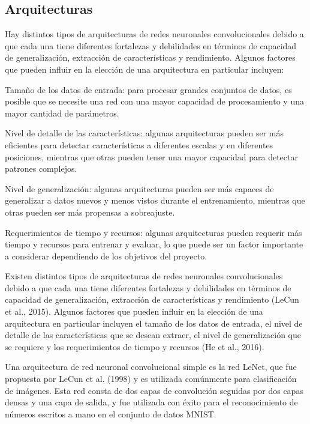 
\subsection{Arquitecturas}


Hay distintos tipos de arquitecturas de redes neuronales convolucionales debido a que cada una tiene diferentes
fortalezas y debilidades en términos de capacidad de generalización, extracción de características y rendimiento.
Algunos factores que pueden influir en la elección de una arquitectura en particular incluyen:

Tamaño de los datos de entrada: para procesar grandes conjuntos de datos, es posible que se necesite una red con una
mayor capacidad de procesamiento y una mayor cantidad de parámetros.

Nivel de detalle de las características: algunas arquitecturas pueden ser más eficientes para detectar características
a diferentes escalas y en diferentes posiciones, mientras que otras pueden tener una mayor capacidad para detectar
patrones complejos.

Nivel de generalización: algunas arquitecturas pueden ser más capaces de generalizar a datos nuevos y menos vistos
durante el entrenamiento, mientras que otras pueden ser más propensas a sobreajuste.

Requerimientos de tiempo y recursos: algunas arquitecturas pueden requerir más tiempo y recursos para entrenar y
evaluar, lo que puede ser un factor importante a considerar dependiendo de los objetivos del proyecto.


Existen distintos tipos de arquitecturas de redes neuronales convolucionales debido a que cada una tiene diferentes
fortalezas y debilidades en términos de capacidad de generalización, extracción de características y rendimiento (LeCun
et al., 2015). Algunos factores que pueden influir en la elección de una arquitectura en particular incluyen el tamaño
de los datos de entrada, el nivel de detalle de las características que se desean extraer, el nivel de generalización
que se requiere y los requerimientos de tiempo y recursos (He et al., 2016).

Una arquitectura de red neuronal convolucional simple es la red LeNet, que fue propuesta por LeCun et al. (1998) y es
utilizada comúnmente para clasificación de imágenes. Esta red consta de dos capas de convolución seguidas por dos capas
densas y una capa de salida, y fue utilizada con éxito para el reconocimiento de números escritos a mano en el conjunto
de datos MNIST.

